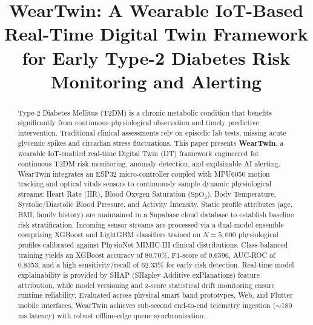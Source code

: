 \documentclass[conference]{IEEEtran}
\begin{document}
\title{WearTwin: A Wearable IoT-Based Real-Time Digital Twin Framework for Early Type-2 Diabetes Risk Monitoring and Alerting}

\author{
\and
{}
}

\maketitle

\begin{abstract}
Type-2 Diabetes Mellitus (T2DM) is a chronic metabolic condition that benefits significantly from continuous physiological observation and timely predictive intervention. Traditional clinical assessments rely on episodic lab tests, missing acute glycemic spikes and circadian stress fluctuations. This paper presents \textbf{WearTwin}, a wearable IoT-enabled real-time Digital Twin (DT) framework engineered for continuous T2DM risk monitoring, anomaly detection, and explainable AI alerting. WearTwin integrates an ESP32 micro-controller coupled with MPU6050 motion tracking and optical vitals sensors to continuously sample dynamic physiological streams: Heart Rate (HR), Blood Oxygen Saturation ($\text{SpO}_2$), Body Temperature, Systolic/Diastolic Blood Pressure, and Activity Intensity. Static profile attributes (age, BMI, family history) are maintained in a Supabase cloud database to establish baseline risk stratification. Incoming sensor streams are processed via a dual-model ensemble comprising XGBoost and LightGBM classifiers trained on $N=5{,}000$ physiological profiles calibrated against PhysioNet MIMIC-III clinical distributions. Class-balanced training yields an XGBoost accuracy of 80.70\%, F1-score of 0.6596, AUC-ROC of 0.8353, and a high sensitivity/recall of 62.33\% for early-risk detection. Real-time model explainability is provided by SHAP (SHapley Additive exPlanations) feature attribution, while model versioning and z-score statistical drift monitoring ensure runtime reliability. Evaluated across physical smart band prototypes, Web, and Flutter mobile interfaces, WearTwin achieves sub-second end-to-end telemetry ingestion ($\sim$180\,ms latency) with robust offline-edge queue synchronization.
\end{abstract}
\end{document}

